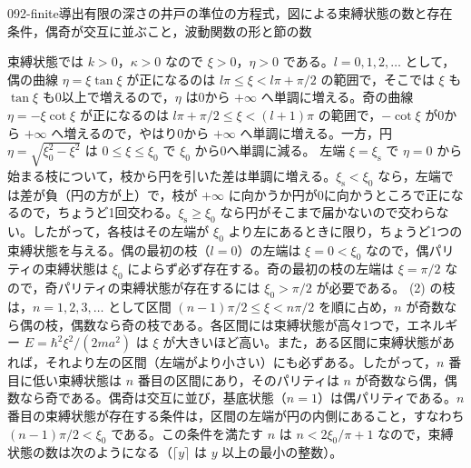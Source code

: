 \documentclass[uplatex,dvipdfmx,a4paper,11pt]{jsarticle}
\begin{document}
\begin{mondai}{092-finite}{導出}{有限の深さの井戸の準位の方程式，図による束縛状態の数と存在条件，偶奇が交互に並ぶこと，波動関数の形と節の数}
\begin{tadashii}
 束縛状態では $k>0$，$\kappa>0$ なので $\xi>0$，$\eta>0$ である。$l=0,1,2,\dots$ として，偶の曲線 $\eta=\xi\tan\xi$ が正になるのは $l\pi\le\xi<l\pi+\pi/2$ の範囲で，そこでは $\xi$ も $\tan\xi$ も0以上で増えるので，$\eta$ は0から $+\infty$ へ単調に増える。奇の曲線 $\eta=-\xi\cot\xi$ が正になるのは $l\pi+\pi/2\le\xi<(l+1)\pi$ の範囲で，$-\cot\xi$ が0から $+\infty$ へ増えるので，やはり0から $+\infty$ へ単調に増える。一方，円 $\eta=\sqrt{\xi_{0}^{2}-\xi^{2}}$ は $0\le\xi\le\xi_{0}$ で $\xi_{0}$ から0へ単調に減る。
左端 $\xi=\xi_{\mathrm{s}}$ で $\eta=0$ から始まる枝について，枝から円を引いた差は単調に増える。$\xi_{\mathrm{s}}<\xi_{0}$ なら，左端では差が負（円の方が上）で，枝が $+\infty$ に向かうか円が0に向かうところで正になるので，ちょうど1回交わる。$\xi_{\mathrm{s}}\ge\xi_{0}$ なら円がそこまで届かないので交わらない。したがって，各枝はその左端が $\xi_{0}$ より左にあるときに限り，ちょうど1つの束縛状態を与える。偶の最初の枝（$l=0$）の左端は $\xi=0<\xi_{0}$ なので，偶パリティの束縛状態は $\xi_{0}$ によらず必ず存在する。奇の最初の枝の左端は $\xi=\pi/2$ なので，奇パリティの束縛状態が存在するには $\xi_{0}>\pi/2$ が必要である。
 (2) の枝は，$n=1,2,3,\dots$ として区間 $(n-1)\pi/2\le\xi<n\pi/2$ を順に占め，$n$ が奇数なら偶の枝，偶数なら奇の枝である。各区間には束縛状態が高々1つで，エネルギー $E=\hbar^{2}\xi^{2}/(2ma^{2})$ は $\xi$ が大きいほど高い。また，ある区間に束縛状態があれば，それより左の区間（左端がより小さい）にも必ずある。したがって，$n$ 番目に低い束縛状態は $n$ 番目の区間にあり，そのパリティは $n$ が奇数なら偶，偶数なら奇である。偶奇は交互に並び，基底状態（$n=1$）は偶パリティである。$n$ 番目の束縛状態が存在する条件は，区間の左端が円の内側にあること，すなわち $(n-1)\pi/2<\xi_{0}$ である。この条件を満たす $n$ は $n<2\xi_{0}/\pi+1$ なので，束縛状態の数は次のようになる（$\lceil y\rceil$ は $y$ 以上の最小の整数）。

\end{tadashii}
\end{mondai}
\end{document}
